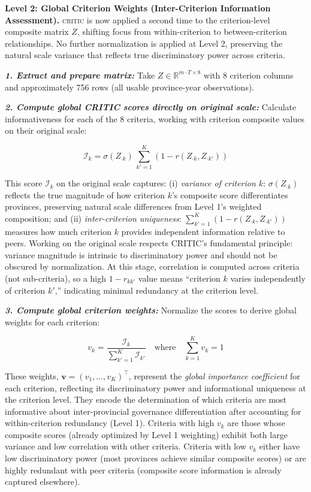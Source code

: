 \documentclass[12pt,a4paper]{article}
\newcommand{\CRITIC}{\textsc{critic}\xspace}
\begin{document}
\textbf{Level 2: Global Criterion Weights (Inter-Criterion Information Assessment).} \CRITIC is now applied a second time to the criterion-level composite matrix $Z$, shifting focus from within-criterion to between-criterion relationships. No further normalization is applied at Level 2, preserving the natural scale variance that reflects true discriminatory power across criteria.

\textit{\textbf{1. Extract and prepare matrix:}} Take $Z \in \mathbb{R}^{m \cdot T \times 8}$ with 8 criterion columns and approximately 756 rows (all usable province-year observations).

\textit{\textbf{2. Compute global CRITIC scores directly on original scale:}} Calculate informativeness for each of the 8 criteria, working with criterion composite values on their original scale:

\begin{equation}
\label{eq:critic_level2}
\mathcal{I}_k = \sigma(Z_{\cdot k}) \, \sum_{k'=1}^{K} \left(1 - r(Z_{\cdot k}, Z_{\cdot k'})\right)
\end{equation}

This score $\mathcal{I}_k$ on the original scale captures: (i) \emph{variance of criterion $k$}: $\sigma(Z_{\cdot k})$ reflects the true magnitude of how criterion $k$'s composite score differentiates provinces, preserving natural scale differences from Level 1's weighted composition; and (ii) \emph{inter-criterion uniqueness}: $\sum_{k'=1}^{K} (1 - r(Z_{\cdot k}, Z_{\cdot k'}))$ measures how much criterion $k$ provides independent information relative to peers. Working on the original scale respects CRITIC's fundamental principle: variance magnitude is intrinsic to discriminatory power and should not be obscured by normalization. At this stage, correlation is computed across criteria (not sub-criteria), so a high $1 - r_{kk'}$ value means ``criterion $k$ varies independently of criterion $k'$,'' indicating minimal redundancy at the criterion level.

\textit{\textbf{3. Compute global criterion weights:}} Normalize the scores to derive global weights for each criterion:

\begin{equation}
\label{eq:weights_level2}
v_k = \frac{\mathcal{I}_k}{\sum_{k'=1}^{K} \mathcal{I}_{k'}} \quad \text{where} \quad \sum_{k=1}^{K} v_k = 1
\end{equation}

These weights, $\mathbf{v} = (v_1, \ldots, v_K)^\top$, represent the \emph{global importance coefficient} for each criterion, reflecting its discriminatory power and informational uniqueness at the criterion level. They encode the determination of which criteria are most informative about inter-provincial governance differentiation after accounting for within-criterion redundancy (Level 1). Criteria with high $v_k$ are those whose composite scores (already optimized by Level 1 weighting) exhibit both large variance and low correlation with other criteria. Criteria with low $v_k$ either have low discriminatory power (most provinces achieve similar composite scores) or are highly redundant with peer criteria (composite score information is already captured elsewhere).
\end{document}
